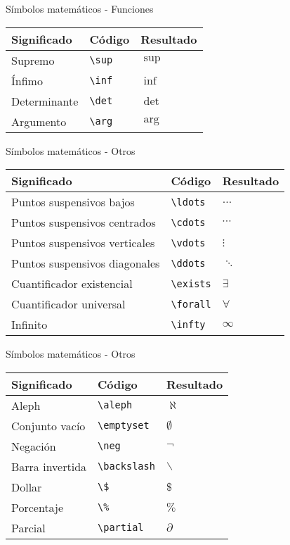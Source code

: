 \documentclass[
  ignorenonframetext,
]{beamer}
\begin{document}
\begin{frame}[fragile]{Símbolos matemáticos - Funciones}
\protect\hypertarget{suxedmbolos-matemuxe1ticos---funciones-2}{}
\begin{longtable}[]{@{}lll@{}}
\toprule
Significado & Código & Resultado \\
\midrule
\endhead
Supremo & \texttt{\textbackslash{}sup} & \(\sup\) \\
Ínfimo & \texttt{\textbackslash{}inf} & \(\inf\) \\
Determinante & \texttt{\textbackslash{}det} & \(\det\) \\
Argumento & \texttt{\textbackslash{}arg} & \(\arg\) \\
\bottomrule
\end{longtable}
\end{frame}

\begin{frame}[fragile]{Símbolos matemáticos - Otros}
\protect\hypertarget{suxedmbolos-matemuxe1ticos---otros}{}
\begin{longtable}[]{@{}lll@{}}
\toprule
Significado & Código & Resultado \\
\midrule
\endhead
Puntos suspensivos bajos & \texttt{\textbackslash{}ldots} &
\(\ldots\) \\
Puntos suspensivos centrados & \texttt{\textbackslash{}cdots} &
\(\cdots\) \\
Puntos suspensivos verticales & \texttt{\textbackslash{}vdots} &
\(\vdots\) \\
Puntos suspensivos diagonales & \texttt{\textbackslash{}ddots} &
\(\ddots\) \\
Cuantificador existencial & \texttt{\textbackslash{}exists} &
\(\exists\) \\
Cuantificador universal & \texttt{\textbackslash{}forall} &
\(\forall\) \\
Infinito & \texttt{\textbackslash{}infty} & \(\infty\) \\
\bottomrule
\end{longtable}
\end{frame}

\begin{frame}[fragile]{Símbolos matemáticos - Otros}
\protect\hypertarget{suxedmbolos-matemuxe1ticos---otros-1}{}
\begin{longtable}[]{@{}lll@{}}
\toprule
Significado & Código & Resultado \\
\midrule
\endhead
Aleph & \texttt{\textbackslash{}aleph} & \(\aleph\) \\
Conjunto vacío & \texttt{\textbackslash{}emptyset} & \(\emptyset\) \\
Negación & \texttt{\textbackslash{}neg} & \(\neg\) \\
Barra invertida & \texttt{\textbackslash{}backslash} & \(\backslash\) \\
Dollar & \texttt{\textbackslash{}\$} & \(\$\) \\
Porcentaje & \texttt{\textbackslash{}\%} & \(\%\) \\
Parcial & \texttt{\textbackslash{}partial} & \(\partial\) \\
\bottomrule
\end{longtable}
\end{frame}
\end{document}
